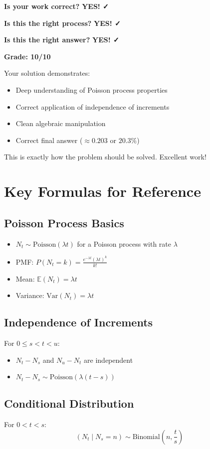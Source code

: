 \documentclass[11pt]{article}
\begin{document}
\begin{tcolorbox}[colback=green!20!white,colframe=green!75!black,title=Final Assessment]
\textbf{Is your work correct?} \textbf{YES! ✓}

\textbf{Is this the right process?} \textbf{YES! ✓}

\textbf{Is this the right answer?} \textbf{YES! ✓}

\vspace{0.3cm}

\textbf{Grade: 10/10}

Your solution demonstrates:
\begin{itemize}
    \item Deep understanding of Poisson process properties
    \item Correct application of independence of increments
    \item Clean algebraic manipulation
    \item Correct final answer ($\approx 0.203$ or $20.3\%$)
\end{itemize}

This is exactly how the problem should be solved. Excellent work!
\end{tcolorbox}

\section{Key Formulas for Reference}

\subsection{Poisson Process Basics}
\begin{itemize}
    \item $N_t \sim \text{Poisson}(\lambda t)$ for a Poisson process with rate $\lambda$
    \item PMF: $P(N_t = k) = \frac{e^{-\lambda t}(\lambda t)^k}{k!}$
    \item Mean: $\mathbb{E}(N_t) = \lambda t$
    \item Variance: $\text{Var}(N_t) = \lambda t$
\end{itemize}

\subsection{Independence of Increments}
For $0 \leq s < t < u$:
\begin{itemize}
    \item $N_t - N_s$ and $N_u - N_t$ are independent
    \item $N_t - N_s \sim \text{Poisson}(\lambda(t - s))$
\end{itemize}

\subsection{Conditional Distribution}
For $0 < t < s$:
\[
(N_t \mid N_s = n) \sim \text{Binomial}\left(n, \frac{t}{s}\right)
\]
\end{document}
